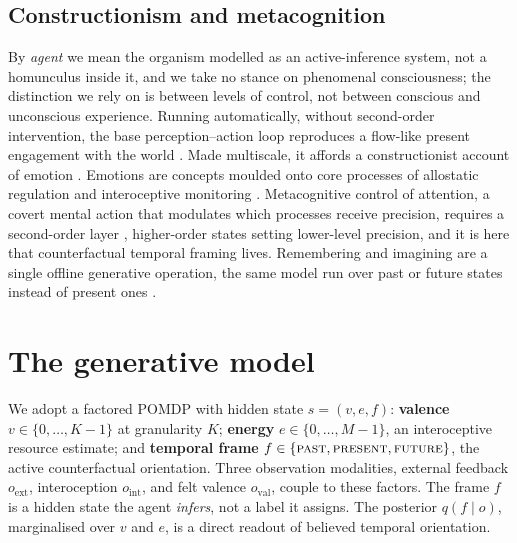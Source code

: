 \documentclass[11pt,a4paper]{article}
\begin{document}
\subsection{Constructionism and metacognition}
By \emph{agent} we mean the organism modelled as an active-inference system, not a
homunculus inside it, and we take no stance on phenomenal consciousness; the
distinction we rely on is between levels of control, not between conscious and
unconscious experience. Running automatically, without second-order intervention, the
base perception--action loop reproduces a flow-like present engagement
with the world \citep{rietveld2014}. Made multiscale, it affords a
constructionist account of emotion \citep{barrett2017theory}. Emotions are concepts
moulded onto core processes of allostatic regulation and interoceptive monitoring
\citep{seth2016interoceptive,stephan2016allostatic}. Metacognitive control of
attention, a covert mental action that modulates which processes receive precision,
requires a second-order layer \citep{sandvedsmith2021}, higher-order states setting
lower-level precision, and it is here that counterfactual temporal framing lives.
Remembering and imagining are a single offline generative operation, the same model
run over past or future states instead of present ones \citep{schacter-addis2007}.

\section{The generative model}\label{sec:model}
We adopt a factored POMDP with hidden state $s=(v,e,f)$: \textbf{valence}
$v\in\{0,\dots,K{-}1\}$ at granularity $K$; \textbf{energy} $e\in\{0,\dots,M{-}1\}$,
an interoceptive resource estimate; and \textbf{temporal frame}
$f\in\{\textsc{past},\textsc{present},\textsc{future}\}$, the active counterfactual
orientation. Three observation modalities, external feedback $o_{\text{ext}}$,
interoception $o_{\text{int}}$, and felt valence $o_{\text{val}}$, couple to these
factors. The frame $f$ is a hidden state the agent \emph{infers}, not a label it
assigns. The posterior $q(f\mid o)$, marginalised over $v$ and $e$, is a direct
readout of believed temporal orientation.
\end{document}

